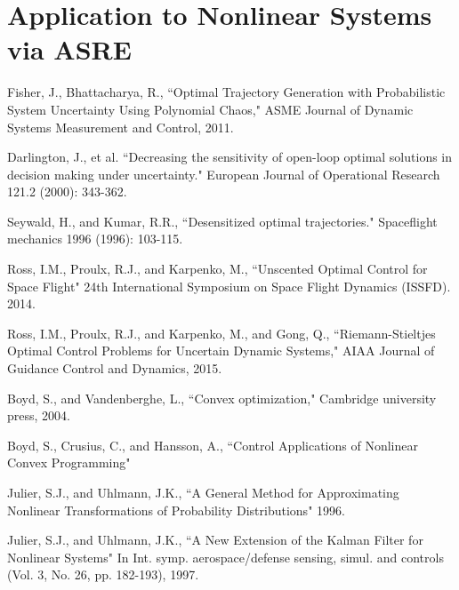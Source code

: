 \documentclass[10pt,a4paper]{article}
\begin{document}
\section{Application to Nonlinear Systems via ASRE}	
	\begin{thebibliography}{1}
		
		
		 Fisher, J., Bhattacharya, R., ``Optimal Trajectory Generation with Probabilistic System Uncertainty Using Polynomial Chaos," ASME Journal of Dynamic Systems Measurement and Control, 2011.
		
		Darlington, J., et al. ``Decreasing the sensitivity of open-loop optimal solutions in decision making under uncertainty." European Journal of Operational Research 121.2 (2000): 343-362.
		
		Seywald, H., and Kumar, R.R., ``Desensitized optimal trajectories." Spaceflight mechanics 1996 (1996): 103-115.
		
		Ross, I.M., Proulx, R.J., and Karpenko, M., ``Unscented Optimal Control for Space Flight" 24th International Symposium on Space Flight Dynamics (ISSFD). 2014.
		
		Ross, I.M., Proulx, R.J., and Karpenko, M., and Gong, Q., ``Riemann-Stieltjes Optimal Control Problems for Uncertain Dynamic Systems," AIAA Journal of Guidance Control and Dynamics, 2015.
		
		Boyd, S., and Vandenberghe, L., ``Convex optimization," Cambridge university press, 2004.
		
		Boyd, S., Crusius, C., and Hansson, A., ``Control Applications of Nonlinear Convex Programming"
		
		Julier, S.J., and Uhlmann, J.K., ``A General Method for Approximating Nonlinear Transformations of Probability Distributions" 1996.

		Julier, S.J., and Uhlmann, J.K., ``A New Extension of the Kalman Filter for Nonlinear Systems" In Int. symp. aerospace/defense sensing, simul. and controls (Vol. 3, No. 26, pp. 182-193), 1997.
		

\end{thebibliography}
\end{document}
